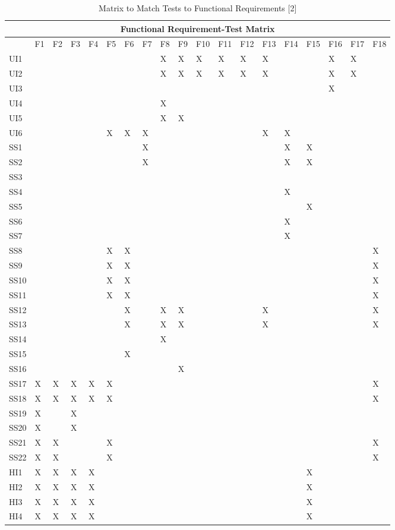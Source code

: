 \documentclass[11pt]{article}
\begin{document}
\begin{table}[H]
\centering
\caption{Matrix to Match Tests to Functional Requirements [2]}
\label{my-label}
\begin{tabular}{| l | l | l | l | l | l | l | l | l | l | l | l | l | l | l | l | l | l | l |}
\hline
\multicolumn{19}{|c|}{\textbf{Functional Requirement-Test Matrix}}                          \\ \hline
 & \tiny{F1} & \tiny{F2} & \tiny{F3} & \tiny{F4} & \tiny{F5} & \tiny{F6} & \tiny{F7} & \tiny{F8} & \tiny{F9} & \tiny{F10} & \tiny{F11} & \tiny{F12} & \tiny{F13} & \tiny{F14} & \tiny{F15} & \tiny{F16} & \tiny{F17} & \tiny{F18} \\ \hline
UI1&&&&&&&&X&X&X&X&X&X&&&X&X& \\ \hline
UI2&&&&&&&&X&X&X&X&X&X&&&X&X& \\ \hline
UI3&&&&&&&&&&&&&&&&X&& \\ \hline
UI4&&&&&&&&X&&&&&&&&&& \\ \hline
UI5&&&&&&&&X&X&&&&&&&&& \\ \hline
UI6&&&&&X&X&X&&&&&&X&X&&&& \\ \hline
SS1&&&&&&&X&&&&&&&X&X&&& \\ \hline
SS2&&&&&&&X&&&&&&&X&X&&& \\ \hline
SS3&&&&&&&&&&&&&&&&&& \\ \hline
SS4&&&&&&&&&&&&&&X&&&& \\ \hline
SS5&&&&&&&&&&&&&&&X&&& \\ \hline
SS6&&&&&&&&&&&&&&X&&&& \\ \hline
SS7&&&&&&&&&&&&&&X&&&& \\ \hline
SS8&&&&&X&X&&&&&&&&&&&&X \\ \hline
SS9&&&&&X&X&&&&&&&&&&&&X \\ \hline
SS10&&&&&X&X&&&&&&&&&&&&X \\ \hline
SS11&&&&&X&X&&&&&&&&&&&&X \\ \hline
SS12&&&&&&X&&X&X&&&&X&&&&&X \\ \hline
SS13&&&&&&X&&X&X&&&&X&&&&&X \\ \hline
SS14&&&&&&&&X&&&&&&&&&& \\ \hline
SS15&&&&&&X&&&&&&&&&&&& \\ \hline
SS16&&&&&&&&&X&&&&&&&&& \\ \hline
SS17&X&X&X&X&X&&&&&&&&&&&&&X \\ \hline
SS18&X&X&X&X&X&&&&&&&&&&&&&X \\ \hline
SS19&X&&X&&&&&&&&&&&&&&& \\ \hline
SS20&X&&X&&&&&&&&&&&&&&& \\ \hline
SS21&X&X&&&X&&&&&&&&&&&&&X \\ \hline
SS22&X&X&&&X&&&&&&&&&&&&&X \\ \hline
HI1&X&X&X&X&&&&&&&&&&&X&&& \\ \hline
HI2&X&X&X&X&&&&&&&&&&&X&&& \\ \hline
HI3&X&X&X&X&&&&&&&&&&&X&&& \\ \hline
HI4&X&X&X&X&&&&&&&&&&&X&&& \\ \hline
\end{tabular}
\end{table}
\end{document}
